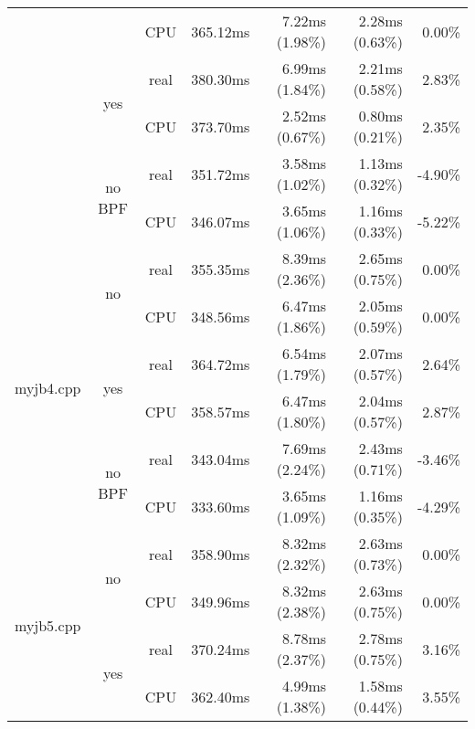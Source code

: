 \documentclass[en]{pracamgr}
\begin{document}
\begin{appendices}
\begin{small}
\begin{longtable}{|l|c|c|r|r|r|r|}
                            &                         & CPU  & 365.12ms & 7.22ms (1.98\%) & 2.28ms (0.63\%) & 0.00\% \\*
                            \cline{2-7}
                            & \multirow{2}{*}{yes}    & real & 380.30ms & 6.99ms (1.84\%) & 2.21ms (0.58\%) & 2.83\% \\*
                            &                         & CPU  & 373.70ms & 2.52ms (0.67\%) & 0.80ms (0.21\%) & 2.35\% \\*
                            \cline{2-7}
                            & \multirow{2}{*}{no BPF} & real & 351.72ms & 3.58ms (1.02\%) & 1.13ms (0.32\%) & -4.90\% \\*
                            &                         & CPU  & 346.07ms & 3.65ms (1.06\%) & 1.16ms (0.33\%) & -5.22\% \\
\hline
\multirow{6}{*}{myjb4.cpp}  & \multirow{2}{*}{no}     & real & 355.35ms & 8.39ms (2.36\%) & 2.65ms (0.75\%) & 0.00\% \\*
                            &                         & CPU  & 348.56ms & 6.47ms (1.86\%) & 2.05ms (0.59\%) & 0.00\% \\*
                            \cline{2-7}
                            & \multirow{2}{*}{yes}    & real & 364.72ms & 6.54ms (1.79\%) & 2.07ms (0.57\%) & 2.64\% \\*
                            &                         & CPU  & 358.57ms & 6.47ms (1.80\%) & 2.04ms (0.57\%) & 2.87\% \\*
                            \cline{2-7}
                            & \multirow{2}{*}{no BPF} & real & 343.04ms & 7.69ms (2.24\%) & 2.43ms (0.71\%) & -3.46\% \\*
                            &                         & CPU  & 333.60ms & 3.65ms (1.09\%) & 1.16ms (0.35\%) & -4.29\% \\
\hline
\multirow{6}{*}{myjb5.cpp}  & \multirow{2}{*}{no}     & real & 358.90ms & 8.32ms (2.32\%) & 2.63ms (0.73\%) & 0.00\% \\*
                            &                         & CPU  & 349.96ms & 8.32ms (2.38\%) & 2.63ms (0.75\%) & 0.00\% \\*
                            \cline{2-7}
                            & \multirow{2}{*}{yes}    & real & 370.24ms & 8.78ms (2.37\%) & 2.78ms (0.75\%) & 3.16\% \\*
                            &                         & CPU  & 362.40ms & 4.99ms (1.38\%) & 1.58ms (0.44\%) & 3.55\% \\*

\end{longtable}
\end{small}
\end{appendices}
\end{document}
